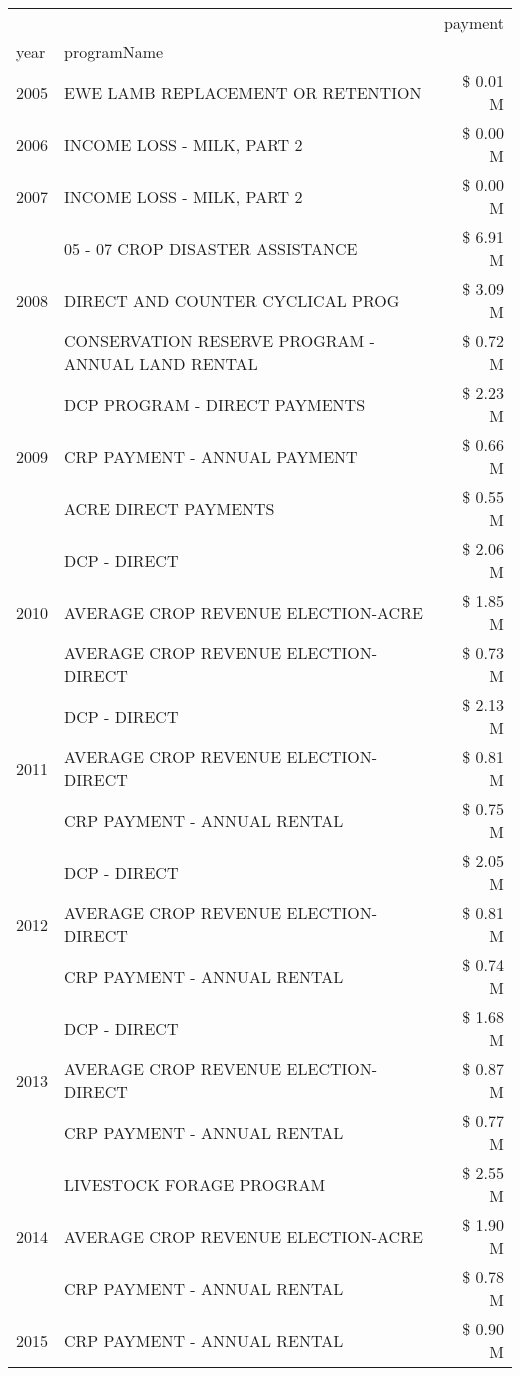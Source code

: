 \begin{tabular}{llr}
\toprule
 &  & payment \\
year & programName &  \\
\midrule
2005 & EWE LAMB REPLACEMENT OR RETENTION & \$ 0.01 M \\
\cline{1-3}
2006 & INCOME LOSS - MILK, PART 2 & \$ 0.00 M \\
\cline{1-3}
2007 & INCOME LOSS - MILK, PART 2 & \$ 0.00 M \\
\cline{1-3}
\multirow[t]{3}{*}{2008} & 05 - 07 CROP DISASTER ASSISTANCE & \$ 6.91 M \\
 & DIRECT AND COUNTER CYCLICAL PROG & \$ 3.09 M \\
 & CONSERVATION RESERVE PROGRAM - ANNUAL LAND RENTAL & \$ 0.72 M \\
\cline{1-3}
\multirow[t]{3}{*}{2009} & DCP PROGRAM - DIRECT PAYMENTS & \$ 2.23 M \\
 & CRP PAYMENT - ANNUAL PAYMENT & \$ 0.66 M \\
 & ACRE DIRECT PAYMENTS & \$ 0.55 M \\
\cline{1-3}
\multirow[t]{3}{*}{2010} & DCP - DIRECT & \$ 2.06 M \\
 & AVERAGE CROP REVENUE ELECTION-ACRE & \$ 1.85 M \\
 & AVERAGE CROP REVENUE ELECTION-DIRECT & \$ 0.73 M \\
\cline{1-3}
\multirow[t]{3}{*}{2011} & DCP - DIRECT & \$ 2.13 M \\
 & AVERAGE CROP REVENUE ELECTION-DIRECT & \$ 0.81 M \\
 & CRP PAYMENT - ANNUAL RENTAL & \$ 0.75 M \\
\cline{1-3}
\multirow[t]{3}{*}{2012} & DCP - DIRECT & \$ 2.05 M \\
 & AVERAGE CROP REVENUE ELECTION-DIRECT & \$ 0.81 M \\
 & CRP PAYMENT - ANNUAL RENTAL & \$ 0.74 M \\
\cline{1-3}
\multirow[t]{3}{*}{2013} & DCP - DIRECT & \$ 1.68 M \\
 & AVERAGE CROP REVENUE ELECTION-DIRECT & \$ 0.87 M \\
 & CRP PAYMENT - ANNUAL RENTAL & \$ 0.77 M \\
\cline{1-3}
\multirow[t]{3}{*}{2014} & LIVESTOCK FORAGE PROGRAM & \$ 2.55 M \\
 & AVERAGE CROP REVENUE ELECTION-ACRE & \$ 1.90 M \\
 & CRP PAYMENT - ANNUAL RENTAL & \$ 0.78 M \\
\cline{1-3}
\multirow[t]{3}{*}{2015} & CRP PAYMENT - ANNUAL RENTAL & \$ 0.90 M \\

\end{tabular}
